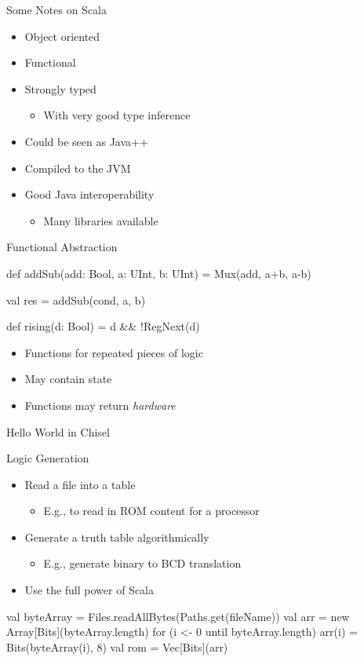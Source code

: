 \begin{frame}[fragile]{Some Notes on Scala}
\begin{itemize}
\item Object oriented
\item Functional
\item Strongly typed
\begin{itemize}
\item With very good type inference
\end{itemize}
\item Could be seen as Java++
\item Compiled to the JVM
\item Good Java interoperability
\begin{itemize}
\item Many libraries available
\end{itemize}
\end{itemize}
\end{frame}

\begin{frame}[fragile]{Functional Abstraction}
\begin{chisel}
  def addSub(add: Bool, a: UInt, b: UInt) =
    Mux(add, a+b, a-b)

  val res = addSub(cond, a, b)
  
  def rising(d: Bool) = d && !RegNext(d)
\end{chisel}
\begin{itemize}
\item Functions for repeated pieces of logic
\item May contain state
\item Functions may return \emph{hardware}
\end{itemize}
\end{frame}


\begin{frame}[fragile]{Hello World in Chisel}
\end{frame}




\begin{frame}[fragile]{Logic Generation}
\begin{itemize}
\item Read a file into a table
\begin{itemize}
\item E.g., to read in ROM content for a processor
\end{itemize}
\item Generate a truth table algorithmically
\begin{itemize}
\item E.g., generate binary to BCD translation
\end{itemize}
\item Use the full power of Scala
\end{itemize}
\begin{chisel}
val byteArray = Files.readAllBytes(Paths.get(fileName))
val arr = new Array[Bits](byteArray.length)
for (i <- 0 until byteArray.length) {
  arr(i) = Bits(byteArray(i), 8)
}
val rom = Vec[Bits](arr)
\end{chisel}
\end{frame}

